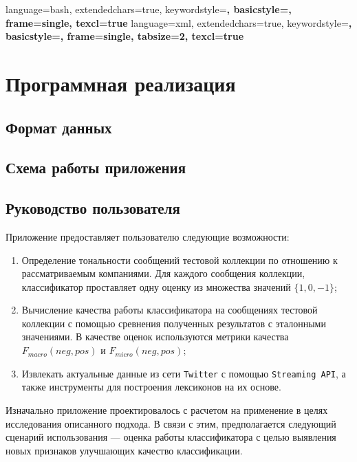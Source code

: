 {
    language=bash,
    extendedchars=true,
    keywordstyle=\bfseries,
    basicstyle=\footnotesize,
    frame=single,
    texcl=true
}
{
    language=xml,
    extendedchars=true,
    keywordstyle=\bfseries,
    basicstyle=\footnotesize,
    frame=single,
    tabsize=2,
    texcl=true
}

\newpage
\section{Программная реализация}
    \subsection{Формат данных}

    \subsection{Схема работы приложения}

\subsection{Руководство пользователя}
Приложение предоставляет пользователю следующие возможности:
\begin{enumerate}
    \item Определение тональности сообщений тестовой коллекции по отношению к
    рассматриваемым компаниями. Для каждого сообщения коллекции, классификатор
    проставляет одну оценку из множества значений $\{1, 0, -1\}$;
    \item Вычисление качества работы классификатора на сообщениях тестовой
    коллекции с помощью сревнения полученных результатов с эталонными значениями.
    В качестве оценок используются метрики качества $F_{macro}(neg, pos)$ и
    $F_{micro}(neg, pos)$;
    \item Извлекать актуальные данные из сети {\tt Twitter} с помощью
    {\tt Streaming API}, а также инструменты для построения лексиконов на их
    основе.
\end{enumerate}

Изначально приложение проектировалось с расчетом на применение в целях
исследования описанного подхода. В связи с этим, предполагается следующий
сценарий использования --- оценка работы классификатора с целью выявления новых
признаков улучшающих качество классификации.

